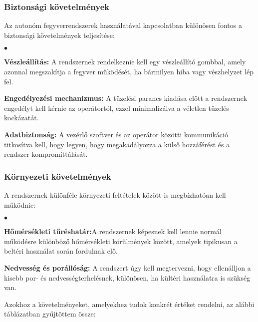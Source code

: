 \subsubsection*{Biztonsági követelmények}

Az autonóm fegyverrendszerek használatával kapcsolatban különösen fontos a biztonsági követelmények teljesítése:

\begin{list}{$\bullet$}{}
	\item \textbf{Vészleállítás:} A rendszernek rendelkeznie kell egy vészleállító gombbal, amely azonnal megszakítja a fegyver működését, ha bármilyen hiba vagy vészhelyzet lép fel.
	\item \textbf{Engedélyezési mechanizmus:} A tüzelési parancs kiadása előtt a rendszernek engedélyt kell kérnie az operátortól, ezzel minimalizálva a véletlen tüzelés kockázatát.
	\item \textbf{Adatbiztonság:} A vezérlő szoftver és az operátor közötti kommunikáció titkosítva kell, hogy legyen, hogy megakadályozza a külső hozzáférést és a rendszer kompromittálását.
\end{list}

\pagebreak

\subsubsection*{Környezeti követelmények}

A rendszernek különféle környezeti feltételek között is megbízhatóan kell működnie:

\begin{list}{$\bullet$}{}
	\item \textbf{Hőmérsékleti tűréshatár:}A rendszernek képesnek kell lennie normál működésre különböző hőmérsékleti körülmények között, amelyek tipikusan a beltéri használat során fordulnak elő.
	\item \textbf{Nedvesség és porállóság:} A rendszert úgy kell megtervezni, hogy ellenálljon a kisebb por- és nedvességterhelésnek, különösen, ha kültéri használatra is szükség van.
\end{list}

Azokhoz a követelményeket, amelyekhez tudok konkrét értéket rendelni, az alábbi táblázatban gyűjtöttem össze:

